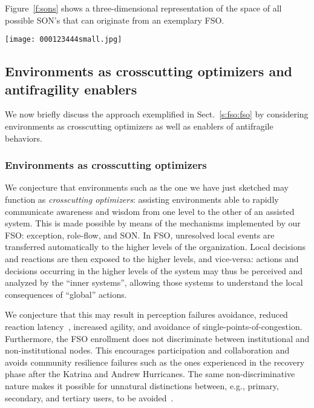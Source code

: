 \documentclass[twocolumn]{svjour3}
\begin{document}
Figure~\ref{f:sons} shows a three-dimensional representation of the space of all possible SON's that can
originate from an exemplary FSO.

\begin{figure*}
\centerline{\texttt{[image: 000123444small.jpg]}}
\caption{The graph represents the set of all the
social overlay networks that may emerge from an FSO with 9 nodes and 5 roles (roles 0--4).
   In this case the FSO consists of three nodes able to play role 0; three nodes able to play respectively roles 1--3;
   and three roles able to play role 4.
   The graph was produced with the POV-Ray ray tracing program~\cite{povray}.}
\label{f:sons}
\end{figure*}



\subsection{Environments as crosscutting optimizers and antifragility enablers}
We now briefly discuss the approach exemplified in Sect.~\ref{s:fso:fso} by considering
environments as crosscutting optimizers as well as enablers of antifragile behaviors.

\subsubsection{Environments as crosscutting optimizers}
We conjecture that environments such as the one
we have just sketched may function as \emph{crosscutting optimizers}: assisting environments
able to rapidly communicate awareness and wisdom from one level to the other of an
assisted system.
This is made possible by means of the mechanisms implemented by our FSO: exception, role-flow, and SON.
In FSO, unresolved local events are transferred automatically to the higher levels of the organization.
Local decisions and reactions are then exposed to the higher levels, and vice-versa: actions and decisions
occurring in the higher levels of the system may thus be perceived and analyzed by the ``inner systems'',
allowing those systems to understand the local consequences of ``global'' actions.

We conjecture that this may result in perception failures avoidance, reduced reaction
latency~\cite{Miskel08,Adair02}, increased agility, and avoidance of single-points-of-congestion.
Furthermore, the FSO enrollment does not discriminate between institutional and non-institutional nodes.
This encourages participation and collaboration and avoids community resilience failures
such as the ones experienced in the recovery phase after the Katrina and
Andrew Hurricanes.
The same non-discriminative nature makes it possible for
unnatural distinctions between, e.g., primary, secondary, and tertiary users, to be avoided~\cite{SDGB07a}.
\end{document}
